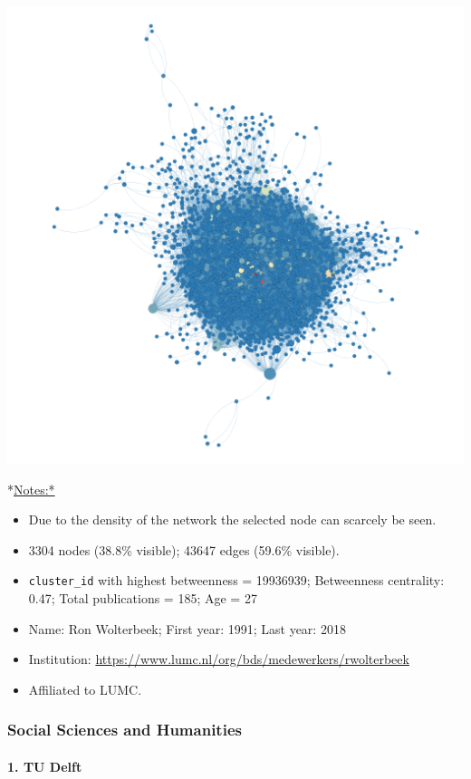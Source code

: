 \documentclass[]{article}
\providecommand{\tightlist}{%
  \setlength{\itemsep}{0pt}\setlength{\parskip}{0pt}}
\let\oldparagraph\paragraph
\renewcommand{\paragraph}[1]{\oldparagraph{#1}\mbox{}}
\begin{document}
\includegraphics{figs/lu_bio_betweenness.png}

*\url{Notes:*}

\begin{itemize}
\tightlist
\item
  Due to the density of the network the selected node can scarcely be
  seen.
\item
  3304 nodes (38.8\% visible); 43647 edges (59.6\% visible).
\item
  \texttt{cluster\_id} with highest betweenness = 19936939; Betweenness
  centrality: 0.47; Total publications = 185; Age = 27
\item
  Name: Ron Wolterbeek; First year: 1991; Last year: 2018
\item
  Institution: \url{https://www.lumc.nl/org/bds/medewerkers/rwolterbeek}
\item
  Affiliated to LUMC.
\end{itemize}

\subsubsection{Social Sciences and
Humanities}\label{social-sciences-and-humanities}

\paragraph{1. TU Delft}\label{tu-delft-2}
\end{document}
